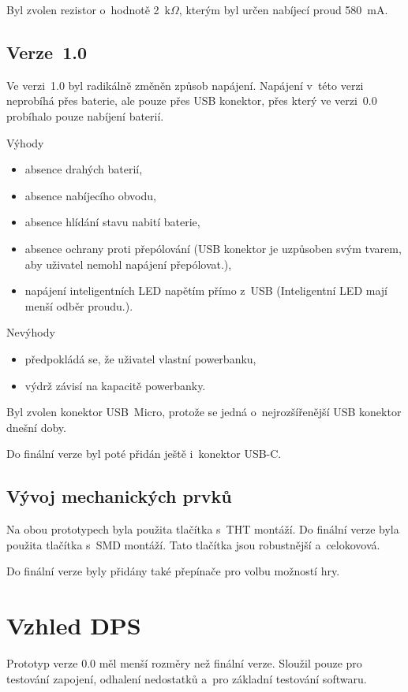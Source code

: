   Byl zvolen rezistor o~hodnotě 2~k$\Omega$, kterým byl určen nabíjecí proud 580~mA. 

  \newpage
  \subsection{Verze~1.0}
  Ve verzi~1.0 byl radikálně změněn způsob napájení. Napájení v~této verzi neprobíhá přes baterie, ale pouze přes USB konektor, přes 
  který ve verzi~0.0 probíhalo pouze nabíjení baterií. 

  Výhody
  \begin{itemize}
    \item absence drahých baterií,
    \item absence nabíjecího obvodu,
    \item absence hlídání stavu nabití baterie,
    \item absence ochrany proti přepólování (USB konektor je uzpůsoben svým tvarem, aby uživatel nemohl napájení přepólovat.),
    \item napájení inteligentních LED napětím přímo z~USB (Inteligentní LED mají menší odběr proudu.).
  \end{itemize}

  Nevýhody
  \begin{itemize}
    \item předpokládá se, že uživatel vlastní powerbanku,
    \item výdrž závisí na kapacitě powerbanky. 
  \end{itemize}

  Byl zvolen konektor USB~Micro, protože se jedná o~nejrozšířenější USB konektor dnešní doby.

  Do finální verze byl poté přidán ještě i~konektor USB-C.

  \subsection{Vývoj mechanických prvků}
  Na obou prototypech byla použita tlačítka s~THT montáží. Do finální verze byla použita tlačítka s~SMD montáží. Tato tlačítka jsou 
  robustnější a~celokovová. 

  Do finální verze byly přidány také přepínače pro volbu možností hry. 

  \section{Vzhled DPS}
  Prototyp verze 0.0 měl menší rozměry než finální verze. Sloužil pouze pro testování zapojení, odhalení nedostatků a~pro základní testování
  softwaru. 

